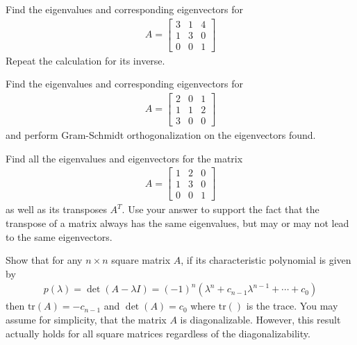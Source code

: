 \begin{Exercise}
Find the eigenvalues and corresponding eigenvectors for
\begin{align*}
A =
\begin{bmatrix}
3 & 1 & 4\\
1 & 3 & 0\\
0 & 0 & 1
\end{bmatrix}
\end{align*}
Repeat the calculation for its inverse.
\end{Exercise}

\begin{Exercise}
Find the eigenvalues and corresponding eigenvectors for
\begin{align*}
A =
\begin{bmatrix}
2 & 0 & 1\\
1 & 1 & 2\\
3 & 0 & 0
\end{bmatrix}
\end{align*}
and perform Gram-Schmidt orthogonalization on the eigenvectors found.
\end{Exercise}

\begin{Exercise}
Find all the eigenvalues and eigenvectors for the matrix
\begin{align*}
A = \begin{bmatrix}
1 & 2 & 0 \\
1 & 3 & 0 \\
0 & 0 & 1
\end{bmatrix}
\end{align*}
as well as its transposes $A^T$. Use your answer to support the fact that the transpose of a matrix always has the same eigenvalues, but may or may not lead to the same eigenvectors.
\end{Exercise}

\begin{Exercise}
Show that for any $n \times n$ square matrix $A$, if its characteristic polynomial is given by
\begin{align*}
p(\lambda) = \det(A-\lambda I) = (-1)^n(\lambda^n + c_{n-1}\lambda^{n-1} + \cdots + c_0)
\end{align*}
then $\text{tr}(A) = -c_{n-1}$ and $\det(A) = c_0$ where $\text{tr}()$ is the trace. You may assume for simplicity, that the matrix $A$ is diagonalizable. However, this result actually holds for all square matrices regardless of the diagonalizability.
\end{Exercise}

